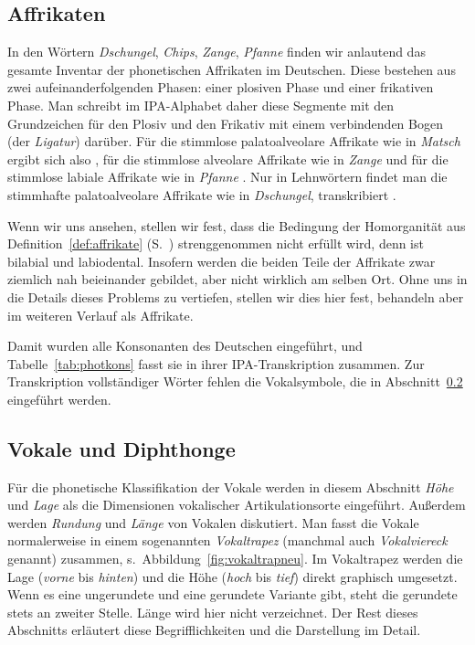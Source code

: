 \subsection{Affrikaten}

\label{sec:affrikatenartikulationsorte}


In den Wörtern \textit{Dschungel}, \textit{Chips}, \textit{Zange}, \textit{Pfanne} finden wir anlautend das gesamte Inventar der phonetischen Affrikaten im Deutschen.
Diese bestehen aus zwei aufeinanderfolgenden Phasen: einer plosiven Phase und einer frikativen Phase.
Man schreibt im IPA-Alphabet daher diese Segmente mit den Grundzeichen für den Plosiv und den Frikativ mit einem verbindenden Bogen (der \textit{Ligatur}) darüber.
Für die stimmlose palatoalveolare Affrikate wie in \textit{Matsch} ergibt sich also \textipa{[\t{tS}]}, für die stimmlose alveolare Affrikate wie in \textit{Zange} \textipa{[\t{ts}]} und für die stimmlose labiale Affrikate wie in \textit{Pfanne} \textipa{[\t{pf}]}.
Nur in Lehnwörtern findet man die stimmhafte palatoalveolare Affrikate wie in \textit{Dschungel}, transkribiert \textipa{[\t{dZ}]}.

Wenn wir uns \textipa{[\t{pf}]} ansehen, stellen wir fest, dass die Bedingung der Homorganität aus Definition~\ref{def:affrikate} (S.~\pageref{def:affrikate}) strenggenommen nicht erfüllt wird, denn \textipa{[p]} ist bilabial und \textipa{[f]} labiodental.
Insofern werden die beiden Teile der Affrikate zwar ziemlich nah beieinander gebildet, aber nicht wirklich am selben Ort.
Ohne uns in die Details dieses Problems zu vertiefen, stellen wir dies hier fest, behandeln \textipa{[\t{pf}]} aber im weiteren Verlauf als Affrikate.

Damit wurden alle Konsonanten des Deutschen eingeführt, und Tabelle~\ref{tab:photkons} fasst sie in ihrer IPA-Transkription zusammen.
Zur Transkription vollständiger Wörter fehlen die Vokalsymbole, die in Abschnitt~\ref{sec:vokalediphthonge} eingeführt werden.

\subsection{Vokale und Diphthonge}

\label{sec:vokalediphthonge}

Für die phonetische Klassifikation der Vokale werden in diesem Abschnitt \textit{Höhe} und \textit{Lage} als die Dimensionen vokalischer Artikulationsorte eingeführt.
Außerdem werden \textit{Rundung} und \textit{Länge} von Vokalen diskutiert.
Man fasst die Vokale normalerweise in einem sogenannten \textit{Vokaltrapez} (manchmal auch \textit{Vokalviereck} genannt) zusammen, s.\ Abbildung~\ref{fig:vokaltrapneu}.
Im Vokaltrapez werden die Lage (\textit{vorne} bis \textit{hinten}) und die Höhe (\textit{hoch} bis \textit{tief}) direkt graphisch umgesetzt.
Wenn es eine ungerundete und eine gerundete Variante gibt, steht die gerundete stets an zweiter Stelle.
Länge wird hier nicht verzeichnet.
Der Rest dieses Abschnitts erläutert diese Begrifflichkeiten und die Darstellung im Detail.

